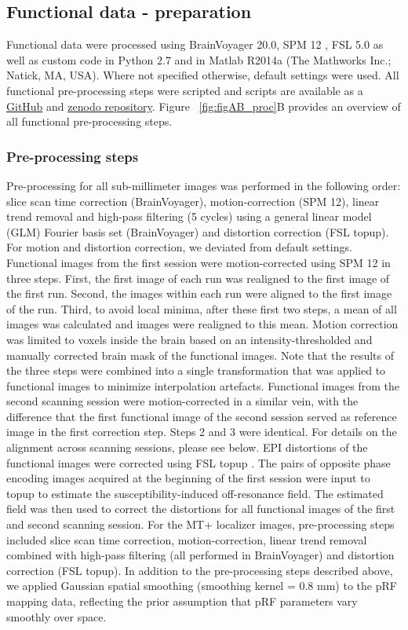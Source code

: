 \subsection{Functional data - preparation}
Functional data were processed using BrainVoyager 20.0, SPM 12 \parencite{Friston2006}, FSL 5.0 \parencite{Jenkinson2012} as well as custom code in Python 2.7 \parencite{numpy2011, scipy2001, matplotlib2007} and in Matlab R2014a (The Mathworks Inc.; Natick, MA, USA). Where not specified otherwise, default settings were used. All functional pre-processing steps were scripted and scripts are available as a \href{https://github.com/MSchnei/motion_quartet_scripts}{GitHub} and \href{https://zenodo.org/record/1489246}{zenodo repository}. Figure ~\ref{fig:figAB_proc}B provides an overview of all functional pre-processing steps. 

\subsubsection{Pre-processing steps}
Pre-processing for all sub-millimeter images was performed in the following order: slice scan time correction (BrainVoyager), motion-correction (SPM 12), linear trend removal and high-pass filtering (5 cycles) using a general linear model (GLM) Fourier basis set (BrainVoyager) and distortion correction (FSL topup). For motion and distortion correction, we deviated from default settings. Functional images from the first session were motion-corrected using SPM 12 in three steps. First, the first image of each run was realigned to the first image of the first run. Second, the images within each run were aligned to the first image of the run. Third, to avoid local minima, after these first two steps, a mean of all images was calculated and images were realigned to this mean. Motion correction was limited to voxels inside the brain based on an intensity-thresholded and manually corrected brain mask of the functional images. Note that the results of the three steps were combined into a single transformation that was applied to functional images to minimize interpolation artefacts. Functional images from the second scanning session were motion-corrected in a similar vein, with the difference that the first functional image of the second session served as reference image in the first correction step. Steps 2 and 3 were identical. For details on the alignment across scanning sessions, please see below. EPI distortions of the functional images were corrected using FSL topup \parencite{Andersson2003, Smith2004}. The pairs of opposite phase encoding images acquired at the beginning of the first session were input to topup to estimate the susceptibility-induced off-resonance field. The estimated field was then used to correct the distortions for all functional images of the first and second scanning session. For the MT+ localizer images, pre-processing steps included slice scan time correction, motion-correction, linear trend removal combined with high-pass filtering (all performed in BrainVoyager) and distortion correction (FSL topup). In addition to the pre-processing steps described above, we applied Gaussian spatial smoothing (smoothing kernel = 0.8 mm) to the pRF mapping data, reflecting the prior assumption that pRF parameters vary smoothly over space.

